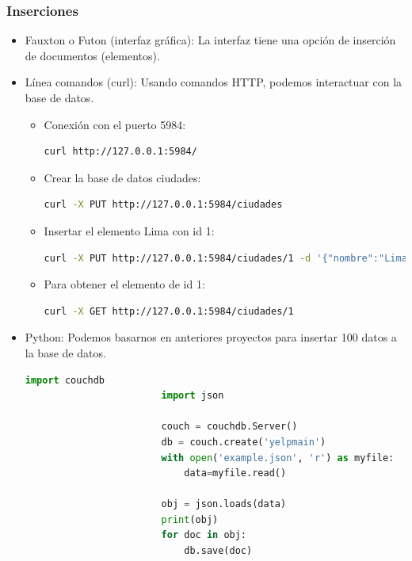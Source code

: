 \documentclass{article}
\begin{document}
            \subsubsection{Inserciones}
                \begin{itemize}
                    \item Fauxton o Futon (interfaz gráfica): La interfaz tiene una opción de inserción de documentos (elementos).
                    \item Línea comandos (curl): Usando comandos HTTP, podemos interactuar con la base de datos.
                    \begin{itemize}
                        \item Conexión con el puerto 5984: 
                        \begin{lstlisting}[language = bash, gobble = 28]
                            curl http://127.0.0.1:5984/
                        \end{lstlisting}
                        \item Crear la base de datos ciudades: 
                        \begin{lstlisting}[language = bash, gobble = 28]
                            curl -X PUT http://127.0.0.1:5984/ciudades
                        \end{lstlisting}
                        \item Insertar el elemento Lima con id 1: 
                        \begin{lstlisting}[language = bash, gobble = 28]
                            curl -X PUT http://127.0.0.1:5984/ciudades/1 -d '{"nombre":"Lima", "pais":"Peru", "habitantes":"8575000"}'
                        \end{lstlisting}
                        \item Para obtener el elemento de id 1: 
                        \begin{lstlisting}[language = bash, gobble = 28]
                            curl -X GET http://127.0.0.1:5984/ciudades/1
                        \end{lstlisting}
                    \end{itemize}
                    \item Python: Podemos basarnos en anteriores proyectos para insertar 100 datos a la base de datos.
                    \begin{lstlisting}[language = python, gobble = 24]
                        import couchdb
                        import json
                    
                        couch = couchdb.Server()
                        db = couch.create('yelpmain')
                        with open('example.json', 'r') as myfile:
                            data=myfile.read()
                        
                        obj = json.loads(data)
                        print(obj)
                        for doc in obj:
                            db.save(doc)
                    \end{lstlisting}
                    \end{itemize}
\end{document}
